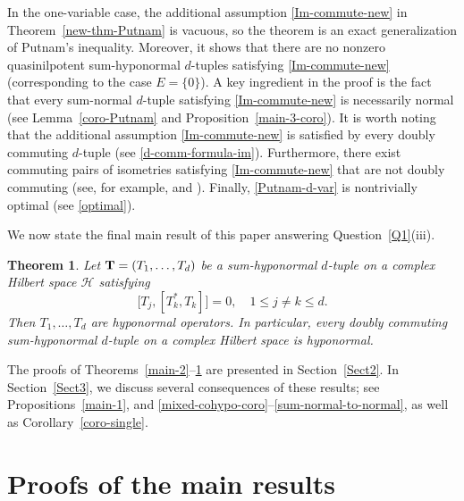 \documentclass[10pt, a4paper, oneside, reqno]{amsproc}
\numberwithin{equation}{section}
\newtheorem{theorem}{Theorem}[section]
\theoremstyle{remark}
\theoremstyle{definition}
\newcommand*{\Le}{\leqslant}
\begin{document}
In the one-variable case, the additional assumption \eqref{Im-commute-new} in Theorem~\ref{new-thm-Putnam} is vacuous, so the theorem is an exact generalization of Putnam's inequality.
Moreover, it shows that there are no nonzero quasinilpotent sum-hyponormal $d$-tuples satisfying \eqref{Im-commute-new} (corresponding to the case $E=\{0\}$). A key ingredient in the proof is the fact that every sum-normal $d$-tuple satisfying \eqref{Im-commute-new} is necessarily normal (see Lemma~\ref{coro-Putnam} and Proposition~\ref{main-3-coro}). It is worth noting that the additional assumption \eqref{Im-commute-new} is satisfied by every doubly commuting $d$-tuple (see \eqref{d-comm-formula-im}). Furthermore, there exist commuting pairs of isometries satisfying \eqref{Im-commute-new} that are not doubly commuting (see, for example, \cite[Theorem~1]{II2006} and \cite[Theorem~2]{IO1994}). Finally, \eqref{Putnam-d-var} is 
nontrivially optimal (see \eqref{optimal}).

We now state the final main result of this paper answering Question~\ref{Q1}(iii).
\begin{theorem} \label{main-3}
Let ${\bf T}=(T_1, \ldots, T_d)$ be a sum-hyponormal $d$-tuple on a complex Hilbert space $\mathcal H$ satisfying
\begin{equation}
\label{double-commutator}
\big[T_j, [T^*_k, T_k]\big] =0,  
\quad 1 \Le j \neq k \Le d.
\end{equation}
Then $T_1, \ldots, T_d$ are hyponormal operators. In particular, every doubly commuting sum-hyponormal $d$-tuple on a complex Hilbert space is hyponormal.
\end{theorem}

The proofs of Theorems~\ref{main-2}--\ref{main-3} are presented in Section~\ref{Sect2}. In Section~\ref{Sect3}, we discuss several consequences of these results; see Propositions~\ref{main-1}, and \ref{mixed-cohypo-coro}--\ref{sum-normal-to-normal}, as well as Corollary~\ref{coro-single}. 

\section{Proofs of the main results \label{Sect2}}
\end{document}
